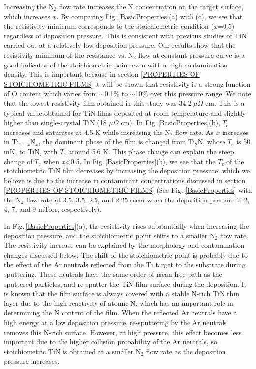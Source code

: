 Increasing the N$_{2}$ flow rate increases the N concentration on the target surface, which increases $x$. By comparing Fig.\,\ref{BasicProperties}(a) with (c), we see that the resistivity minimum corresponds to the stoichiometric condition ($x$=0.5) regardless of deposition pressure. This is consistent with previous studies of TiN carried out at a relatively low deposition pressure.\cite{Ahn1983,Schiller1984}   Our results show that the resistivity minimum of the resistance vs. N$_{2}$ flow at constant pressure curve is a good indicator of the stoichiometric point even with a high contamination density.  This is important because in section \ref{PROPERTIES OF STOICHIOMETRIC FILMS} it will be shown that resistivity is a strong function of O content which varies from $\sim$0.1\% to $\sim$10\% over this pressure range. We note that the lowest resistivity film obtained in this study was 34.2 $\mu$$\Omega$ cm. This is a typical value obtained for TiN films deposited at room temperature and slightly higher than single-crystal TiN (18 $\mu$$\Omega$ cm).\cite{Johansson1985} In Fig.\,\ref{BasicProperties}(b), $T_{\text{c}}$ increases and saturates at 4.5 K while increasing the N$_{2}$ flow rate. As $x$ increases in Ti$_{1-x}$N$_{x}$, the dominant phase of the film is changed from Ti$_{2}$N, whose $T_{\text{c}}$ is 50 mK, to TiN, with $T_{\text{c}}$ around 5.6 K.\cite{Wriedt1987, Vissers2013, Penilla2008} This phase change can explain the steep change of $T_{\text{c}}$ when $x$<0.5. In Fig.\,\ref{BasicProperties}(b), we see that the $T_{\text{c}}$ of the stoichiometric TiN film decreases by increasing the deposition pressure, which we believe is due to the increase in contaminant concentrations discussed in section \ref{PROPERTIES OF STOICHIOMETRIC FILMS} (See Fig. \ref{BasicProperties} with the N$_{2}$ flow rate at 3.5, 3.5, 2.5, and 2.25 sccm when the deposition pressure is 2, 4, 7, and 9 mTorr, respectively).

In Fig.\,\ref{BasicProperties}(a), the resistivity rises substantially when increasing the deposition pressure, and the stoichiometric point shifts to a smaller N$_{2}$ flow rate. The resistivity increase can be explained by the morphology and contamination changes discussed below. The shift of the stoichiometric point is probably due to the effect of the Ar neutrals reflected from the Ti target to the substrate during sputtering. These neutrals have the same order of mean free path as the sputtered particles,\cite{Lu2012} and re-sputter the TiN film surface during the deposition. It is known that the film surface is always covered with a stable N-rich TiN thin layer due to the high reactivity of atomic N, which has an important role in determining the N content of the film. When the reflected Ar neutrals have a high energy at a low deposition pressure, re-sputtering by the Ar neutrals removes this N-rich surface. However, at high pressure, this effect becomes less important due to the higher collision probability of the Ar neutrals, so stoichiometric TiN is obtained at a smaller N$_{2}$ flow rate as the deposition pressure increases.\cite{Adjaottor1995}

